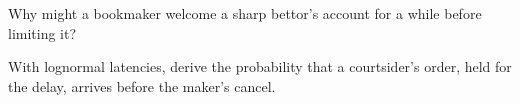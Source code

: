 \begin{interviewq}\label{iq:hf:prediction-and-sports-market-making:5}
Why might a bookmaker welcome a sharp bettor's account for a while before limiting it?
\end{interviewq}

\begin{interviewq}\label{iq:hf:prediction-and-sports-market-making:6}
With lognormal latencies, derive the probability that a courtsider's order, held for the delay, arrives before the maker's cancel.
\end{interviewq}
